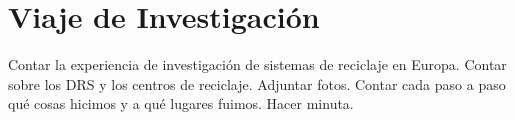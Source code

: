 \chapter{Viaje de Investigación}
\label{cp:europe-trip}

Contar la experiencia de investigación de sistemas de reciclaje en Europa. Contar sobre los DRS y los centros de reciclaje. Adjuntar fotos. Contar cada paso a paso qué cosas hicimos y a qué lugares fuimos. Hacer minuta.
